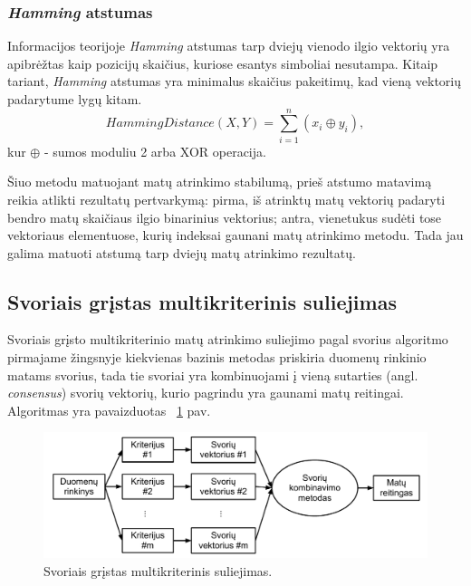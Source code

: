 \subsubsection{\textit{Hamming} atstumas}

Informacijos teorijoje \textit{Hamming} atstumas \cite{hamming1950error} tarp dviejų vienodo ilgio vektorių yra apibrėžtas kaip pozicijų skaičius, kuriose esantys simboliai nesutampa. Kitaip tariant, \textit{Hamming} atstumas yra minimalus skaičius pakeitimų, kad vieną vektorių padarytume lygų kitam. 
\begin{equation}
\label{hamming_distance}
 Hamming Distance(X, Y)= \sum_{i=1}^{n} (x_i \oplus y_i),
\end{equation}
kur $\oplus$ - sumos moduliu 2 arba XOR operacija.

Šiuo metodu matuojant matų atrinkimo stabilumą, prieš atstumo matavimą reikia atlikti rezultatų pertvarkymą: pirma, iš atrinktų matų vektorių padaryti bendro matų skaičiaus ilgio binarinius vektorius; antra, vienetukus sudėti tose vektoriaus elementuose, kurių indeksai gaunani matų atrinkimo metodu. Tada jau galima matuoti atstumą tarp dviejų matų atrinkimo rezultatų.

\subsection{Svoriais grįstas multikriterinis suliejimas}

Svoriais grįsto multikriterinio matų atrinkimo suliejimo pagal svorius algoritmo pirmajame žingsnyje kiekvienas bazinis metodas priskiria duomenų rinkinio matams svorius, tada tie svoriai yra kombinuojami į vieną sutarties (angl. \textit{consensus}) svorių vektorių, kurio pagrindu yra gaunami matų reitingai. Algoritmas yra pavaizduotas ~\ref{fig:figure4} pav.
\begin{figure}
 \centering
 \includegraphics[width=1\textwidth]{images/score_based_fusion.pdf}
 \caption{Svoriais grįstas multikriterinis suliejimas.}
 \label{fig:figure4}
\end{figure}

